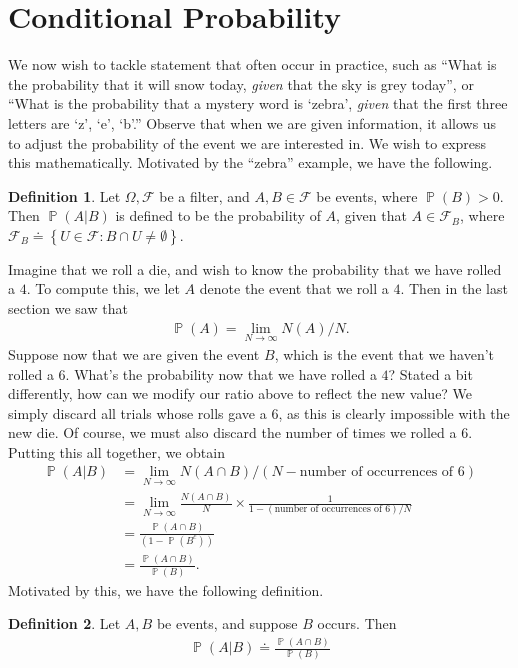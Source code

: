 \documentclass[12pt]{amsbook}
\newcommand{\filter}{\mathcal{F}}
\DeclareMathOperator{\prob}{\mathbb{P}}
\theoremstyle{plain}
\theoremstyle{definition}
\newtheorem*{definition}{Definition}
\theoremstyle{remark}
\numberwithin{equation}{section}  %
\begin{document}
\section{Conditional Probability}
We now wish to tackle statement that often occur in practice,
such as ``What is the probability that it will snow today, \emph{given}
that the sky is grey today'', or ``What is the probability that a mystery word
is `zebra', \emph{given} that the first three letters are
`z', `e', `b'.''
Observe that when we are given information, it allows us to adjust the
probability of the event we are interested in. We wish to express this
mathematically. Motivated by the ``zebra'' example, we have the following.
\begin{definition}
	Let $\Omega, \filter$ be a filter, and $A, B \in \filter$ be events, where
	$\prob(B) > 0$. Then $\prob(A | B)$ is defined to be the probability of 
	$A$, given that $A \in \filter_B$, where $\filter_B
	\doteq \left\{ U \in \filter: B \cap U \neq \emptyset \right\}$.
\end{definition}
Imagine that we roll a die, and wish to know the probability that
we have rolled a $4$.
To compute this, we let $A$ denote the event that we roll a $4$. Then in the 
last section we saw
that
\begin{align*}
	\prob(A) = \lim_{N \to \infty} N(A)/N.
\end{align*}
Suppose now that we are given the event $B$, which is the event that we haven't
rolled a $6$.
What's the probability now that we have rolled a $4$?
Stated a bit differently, how can we modify our ratio above to reflect the
new value? We simply discard all trials whose rolls gave a $6$, as this is 
clearly
impossible with the new die. Of course, we must also discard the number of times
we rolled a $6$. Putting this all together, we obtain
\begin{align*}
	\prob(A | B) & = \lim_{N \to \infty} N(A \cap B)/(N -
	\text{number of occurrences of $6$})
	\\
	& = \lim_{N \to \infty} \frac{N(A \cap B)}{N}
	\times \frac{1}{1 - (\text{number of occurrences of $6$})/N}
	\\
	& = \frac{\prob(A \cap B)}{(1 - \prob(B^c))}
	\\
	& = \frac{\prob(A \cap B)}{\prob(B)}.
\end{align*}
Motivated by this, we have the following definition.
\begin{definition}
	Let $A, B$ be events, and suppose $B$ occurs. Then
	\begin{align*}
		\prob(A | B) \doteq \frac{\prob(A \cap B)}{\prob(B)}
	\end{align*}
\end{definition}
\end{document}
